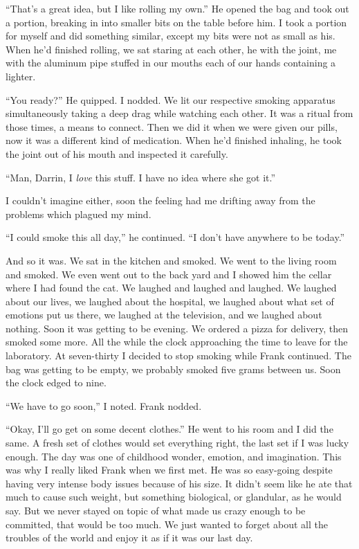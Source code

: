 ``That's a great idea, but I like rolling my own.'' He opened the bag
and took out a portion, breaking in into smaller bits on the table
before him. I took a portion for myself and did something similar,
except my bits were not as small as his. When he'd finished rolling, we
sat staring at each other, he with the joint, me with the aluminum pipe
stuffed in our mouths each of our hands containing a lighter.

``You ready?'' He quipped. I nodded. We lit our respective smoking
apparatus simultaneously taking a deep drag while watching each other.
It was a ritual from those times, a means to connect. Then we did it
when we were given our pills, now it was a different kind of medication.
When he'd finished inhaling, he took the joint out of his mouth and
inspected it carefully.

``Man, Darrin, I \emph{love} this stuff. I have no idea where she got
it.''

I couldn't imagine either, soon the feeling had me drifting away from
the problems which plagued my mind.

``I could smoke this all day,'' he continued. ``I don't have anywhere to
be today.''

And so it was. We sat in the kitchen and smoked. We went to the living
room and smoked. We even went out to the back yard and I showed him the
cellar where I had found the cat. We laughed and laughed and laughed. We
laughed about our lives, we laughed about the hospital, we laughed about
what set of emotions put us there, we laughed at the television, and we
laughed about nothing. Soon it was getting to be evening. We ordered a
pizza for delivery, then smoked some more. All the while the clock
approaching the time to leave for the laboratory. At seven-thirty I
decided to stop smoking while Frank continued. The bag was getting to be
empty, we probably smoked five grams between us. Soon the clock edged to
nine.

``We have to go soon,'' I noted. Frank nodded.

``Okay, I'll go get on some decent clothes.'' He went to his room and I
did the same. A fresh set of clothes would set everything right, the
last set if I was lucky enough. The day was one of childhood wonder,
emotion, and imagination. This was why I really liked Frank when we
first met. He was so easy-going despite having very intense body issues
because of his size. It didn't seem like he ate that much to cause such
weight, but something biological, or glandular, as he would say. But we
never stayed on topic of what made us crazy enough to be committed, that
would be too much. We just wanted to forget about all the troubles of
the world and enjoy it as if it was our last day.

